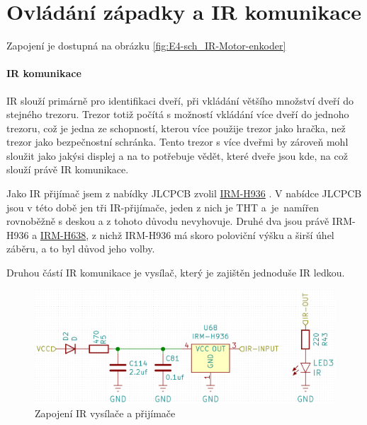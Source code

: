 \section{Ovládání západky a IR komunikace}

Zapojení je dostupná na obrázku \ref{fig:E4-sch_IR-Motor-enkoder}

\paragraph{IR komunikace}
IR slouží primárně pro identifikaci dveří, při vkládání většího množství dveří do stejného trezoru.
Trezor totiž počítá s možností vkládání více dveří do jednoho trezoru, což je jedna ze schopností, kterou více použije trezor jako hračka, než trezor jako bezpečnostní schránka.
Tento trezor s více dveřmi by zároveň mohl sloužit jako jakýsi displej a na to potřebuje vědět, které dveře jsou kde, na což slouží právě IR komunikace. %

Jako IR přijímač jsem z nabídky JLCPCB \parencite{jlcpcb} zvolil \href{https://datasheet.lcsc.com/szlcsc/1912111437_Everlight-Elec-IRM-H936-TR2_C264266.pdf}{IRM-H936} \parencite{irm-h936}. 
V nabídce JLCPCB jsou v této době jen tři IR-přijímače, jeden z nich je THT a~je~namířen rovnoběžně s deskou a z tohoto důvodu nevyhovuje. 
Druhé dva jsou právě IRM-H936 a \href{https://datasheet.lcsc.com/szlcsc/2010221806_Everlight-Elec-IRM-H638T-TR2-DX_C390031.pdf}{IRM-H638},
z nichž IRM-H936 má skoro poloviční výšku a širší úhel záběru, a to byl důvod jeho volby.

Druhou částí IR komunikace je vysílač, který je zajištěn jednoduše IR ledkou.

\begin{figure}[htbp]
    \centering
    \includegraphics[width=\textwidth]{kapitoly/obrazky/E4/ir_motor_enkoder/IR.png}
    \caption{Zapojení IR vysílače a přijímače}
    \label{fig:E4-ir}
\end{figure}

